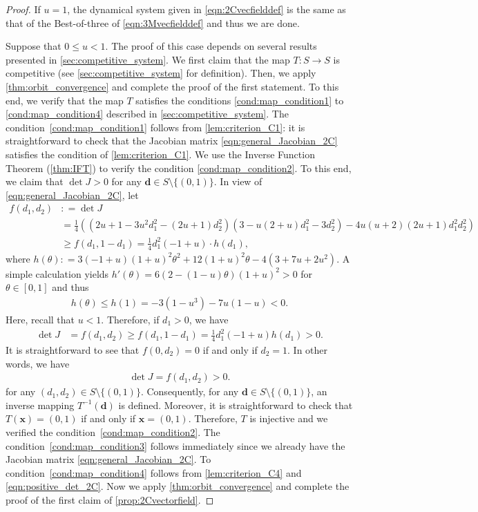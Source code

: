\documentclass[letterpaper,11pt]{article}
\def\defeq{\mathrel{\mathop:}=}%
\begin{document}
%
\begin{proof}
If $u=1$, the dynamical system given in \cref{eqn:2Cvecfielddef} is the same as that of the Best-of-three of \cref{eqn:3Mvecfielddef} and thus we are done.

Suppose that $0\leq u<1$.
The proof of this case depends on several results presented in \cref{sec:competitive_system}.
We first claim that the map $T:S\to S$ is competitive (see \cref{sec:competitive_system} for definition).
Then, we apply \cref{thm:orbit_convergence} and complete the proof of the first statement.
To this end, we verify that the map $T$ satisfies the conditions \ref{cond:map_condition1} to \ref{cond:map_condition4} described in \cref{sec:competitive_system}.
The condition~\ref{cond:map_condition1} follows from \cref{lem:criterion_C1}: it is straightforward to check that the Jacobian matrix \cref{eqn:general_Jacobian_2C} satisfies the condition of \cref{lem:criterion_C1}.
We use the Inverse Function Theorem (\cref{thm:IFT}) to verify the condition \ref{cond:map_condition2}.
To this end, we claim that $\det J>0$ for any $\mathbf{d}\in S\setminus\{(0,1)\}$.
In view of \cref{eqn:general_Jacobian_2C}, let
\begin{align*}
f(d_1,d_2) &\defeq \det J \\
&= \frac{1}{4}((2u+1-3u^2d_1^2-(2u+1)d_2^2)(3-u(2+u)d_1^2-3d_2^2)-4u(u+2)(2u+1)d_1^2d_2^2) \\
&\geq f(d_1,1-d_1) = \frac{1}{4}d_1^2(-1+u)\cdot h(d_1),
\end{align*}
where $h(\theta)\defeq 3(-1+u)(1+u)^2\theta^2 + 12(1+u)^2\theta - 4(3+7u+2u^2)$.
A simple calculation yields $h'(\theta) = 6(2-(1-u)\theta)(1+u)^2>0$ for $\theta\in[0,1]$ and thus 
\begin{align*}
h(\theta)\leq h(1)=-3(1-u^3)-7u(1-u) < 0.
\end{align*}
Here, recall that $u<1$.
Therefore, if $d_1>0$, we have
\begin{align*}
\det J &= f(d_1,d_2)
\geq f(d_1,1-d_1)
= \frac{1}{4}d_1^2(-1+u)h(d_1) >0.
\end{align*}
It is straightforward to see that $f(0,d_2)=0$ if and only if $d_2=1$.
In other words, we have
\begin{align}
\det J =f(d_1,d_2)>0 \label{eqn:positive_det_2C}.
\end{align}
for any $(d_1,d_2)\in S\setminus \{(0,1)\}$.
Consequently, for any $\mathbf{d}\in S\setminus \{(0,1)\}$, an inverse mapping $T^{-1}(\mathbf{d})$ is defined.
Moreover, it is straightforward to check that $T(\mathbf{x})=(0,1)$ if and only if $\mathbf{x}=(0,1)$.
Therefore, $T$ is injective and we verified the condition~\ref{cond:map_condition2}.
The condition~\ref{cond:map_condition3} follows immediately since we already have the Jacobian matrix \cref{eqn:general_Jacobian_2C}.
To condition~\ref{cond:map_condition4} follows from \cref{lem:criterion_C4} and \cref{eqn:positive_det_2C}.
Now we apply \cref{thm:orbit_convergence} and complete the proof of the first claim of \cref{prop:2Cvectorfield}.


\end{proof}
\end{document}
